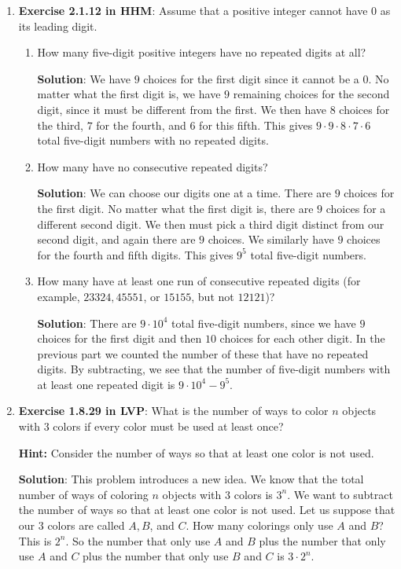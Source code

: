 \documentclass[11pt]{article}
\begin{document}
\begin{enumerate}
\item \textbf{Exercise 2.1.12 in HHM}: Assume that a positive integer cannot have $0$ as its leading digit.
\begin{enumerate}
\item How many five-digit positive integers have no repeated digits at all?

{\bf Solution}:  We have $9$ choices for the first digit since it cannot be a $0$.  No matter what the first digit is, we have $9$ remaining choices for the second digit, since it must be different from the first.  We then have $8$ choices for the third, $7$ for the fourth, and $6$ for this fifth.  This gives $9\cdot 9 \cdot 8\cdot 7\cdot 6$ total five-digit numbers with no repeated digits.

\item How many have no consecutive repeated digits?

{\bf Solution}: We can choose our digits one at a time.  There are $9$ choices for the first digit.  No matter what the first digit is, there are $9$ choices for a different second digit.  We then must pick a third digit distinct from our second digit, and again there are $9$ choices.  We similarly have $9$ choices for the fourth and fifth digits.  This gives $9^5$ total five-digit numbers.


\item How many have at least one run of consecutive repeated digits (for example, $23324, 45551$, or $15155$, but not $12121$)?

{\bf Solution}: There are $9 \cdot 10^4$ total five-digit numbers, since we have $9$ choices for the first digit and then $10$ choices for each other digit.  In the previous part we counted the number of these that have no repeated digits.  By subtracting, we see that the number of five-digit numbers with at least one repeated digit is $9\cdot 10^4 - 9^5$.

\end{enumerate}

\item \textbf{Exercise 1.8.29 in LVP}: What is the number of ways to color $n$ objects with $3$ colors if every color must be used at least once?

\textbf{Hint:} Consider the number of ways so that at least one color is not used.

{\bf Solution}: This problem introduces a new idea.  We know that the total number of ways of coloring $n$ objects with $3$ colors is $3^n$.  We want to subtract the number of ways so that at least one color is not used.  Let us suppose that our $3$ colors are called $A,B$, and $C$.  How many colorings only use $A$ and $B$?  This is $2^n$.  So the number that only use $A$ and $B$ plus the number that only use $A$ and $C$ plus the number that only use $B$ and $C$ is $3 \cdot 2^n$.  


\end{enumerate}
\end{document}
